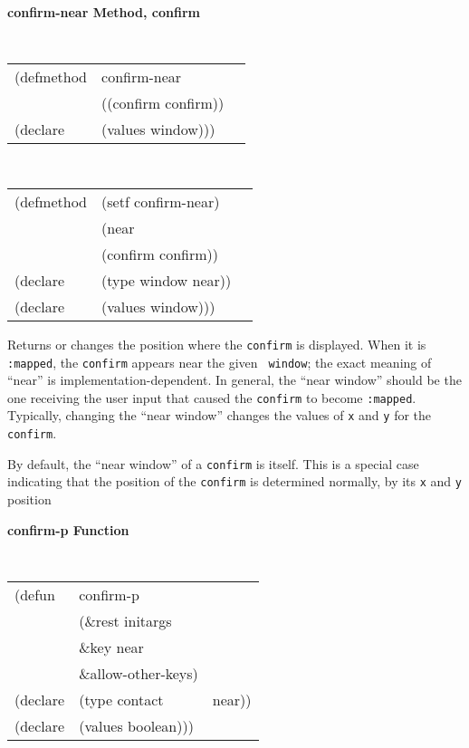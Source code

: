 {\samepage
{\large {\bf confirm-near \hfill Method, confirm}}
\begin{flushright} \parbox[t]{6.125in}{
\tt
\begin{tabular}{lll}
\raggedright
(defmethod & confirm-near & \\
           & ((confirm  confirm)) \\
(declare & (values window)))
\end{tabular}
\rm

}\end{flushright}}

{\samepage
\begin{flushright} \parbox[t]{6.125in}{
\tt
\begin{tabular}{lll}
\raggedright
(defmethod & (setf confirm-near) & \\
         & (near \\
         & (confirm confirm)) \\
(declare &(type window  near))\\
(declare & (values window)))
\end{tabular}
\rm
}
\end{flushright}}


\begin{flushright} \parbox[t]{6.125in}{
Returns or changes the position where the {\tt confirm} is displayed.
When it is {\tt :mapped}, the {\tt confirm} appears near the given {\tt
window}; the exact meaning of ``near'' is implementation-dependent. 
In general, the ``near window'' should be the one receiving the user input that
caused the {\tt confirm} to become {\tt :mapped}. Typically,
changing the
``near window''  changes the values of {\tt x} and {\tt y} for the {\tt
confirm}.

By default, the ``near window'' of a {\tt confirm} is itself. This
is a special case indicating that the position of the {\tt confirm} is
determined normally, by its {\tt x} and {\tt y} position 

}\end{flushright}

{\samepage
{\large {\bf confirm-p \hfill Function}} 
\begin{flushright} \parbox[t]{6.125in}{
\tt
\begin{tabular}{lll}
\raggedright
(defun & confirm-p & \\ 
&  (\&rest initargs \\
&  \&key near  \\
&  \&allow-other-keys)\\
(declare &(type contact & near))\\
(declare & (values boolean)))
\end{tabular}
\rm

}\end{flushright}}

